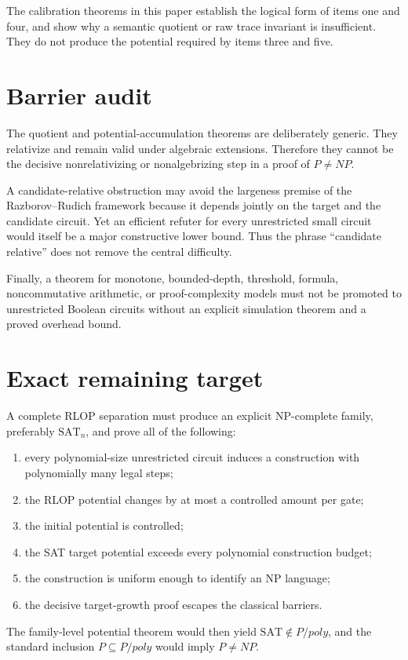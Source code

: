 \documentclass[11pt]{article}
\theoremstyle{definition}
\begin{document}
The calibration theorems in this paper establish the logical form of items
one and four, and show why a semantic quotient or raw trace invariant is
insufficient.  They do not produce the potential required by items three and
five.

\section{Barrier audit}

The quotient and potential-accumulation theorems are deliberately generic.
They relativize and remain valid under algebraic extensions.  Therefore they
cannot be the decisive nonrelativizing or nonalgebrizing step in a proof of
\(P\ne NP\).

A candidate-relative obstruction may avoid the largeness premise of the
Razborov--Rudich framework because it depends jointly on the target and the
candidate circuit.  Yet an efficient refuter for every unrestricted small
circuit would itself be a major constructive lower bound.  Thus the phrase
``candidate relative'' does not remove the central difficulty.

Finally, a theorem for monotone, bounded-depth, threshold, formula,
noncommutative arithmetic, or proof-complexity models must not be promoted to
unrestricted Boolean circuits without an explicit simulation theorem and a
proved overhead bound.

\section{Exact remaining target}

A complete RLOP separation must produce an explicit NP-complete family,
preferably \(\mathrm{SAT}_n\), and prove all of the following:
\begin{enumerate}[leftmargin=*]
\item every polynomial-size unrestricted circuit induces a construction with
polynomially many legal steps;
\item the RLOP potential changes by at most a controlled amount per gate;
\item the initial potential is controlled;
\item the SAT target potential exceeds every polynomial construction budget;
\item the construction is uniform enough to identify an NP language;
\item the decisive target-growth proof escapes the classical barriers.
\end{enumerate}
The family-level potential theorem would then yield
\(\mathrm{SAT}\notin P/poly\), and the standard inclusion
\(P\subseteq P/poly\) would imply \(P\ne NP\).
\end{document}
